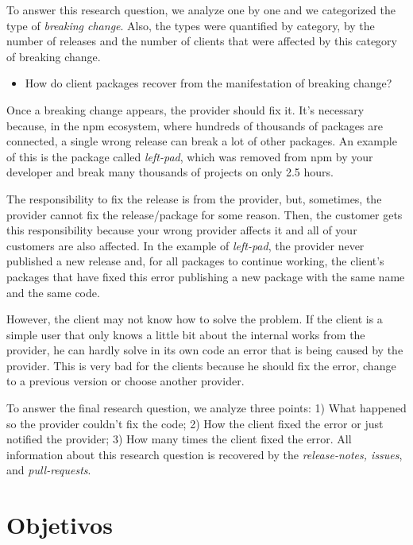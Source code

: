 To answer this research question, we analyze one by one and we categorized the type of \textit{breaking change}. Also, the types were quantified by category, by the number of releases and the number of clients that were affected by this category of breaking change.

\begin{itemize}
    \item How do client packages recover from the manifestation of breaking change?
\end{itemize}

Once a breaking change appears, the provider should fix it. It’s necessary because, in the npm ecosystem, where hundreds of thousands of packages are connected, a single wrong release can break a lot of other packages. An example of this is the package called \textit{left-pad}, which was removed from npm by your developer and break many thousands of projects on only 2.5 hours.

The responsibility to fix the release is from the provider, but, sometimes, the provider cannot fix the release/package for some reason. Then, the customer gets this responsibility because your wrong provider affects it and all of your customers are also affected. In the example of \textit{left-pad}, the provider never published a new release and, for all packages to continue working, the client's packages that have fixed this error publishing a new package with the same name and the same code.

However, the client may not know how to solve the problem. If the client is a simple user that only knows a little bit about the internal works from the provider, he can hardly solve in its own code an error that is being caused by the provider. This is very bad for the clients because he should fix the error, change to a previous version or choose another provider.

To answer the final research question, we analyze three points: 1) What happened so the provider couldn't fix the code; 2) How the client fixed the error or just notified the provider; 3) How many times the client fixed the error. All information about this research question is recovered by the \textit{release-notes, issues}, and \textit{pull-requests}.

\section{Objetivos}
\label{cap:introducao:sec:objetivos}

